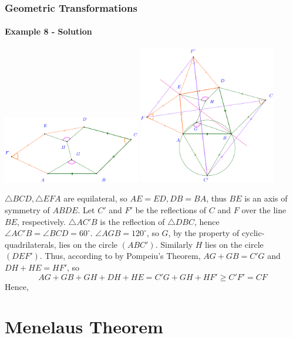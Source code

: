 \documentclass[8pt,xcolor=table,dvipsnames]{beamer}
\newcommand{\dg}{^\circ}
\begin{document}
\begin{frame}[t]
    \frametitle{Geometric Transformations}
    \framesubtitle{Example 8 - Solution}
    \begin{center}
        \begin{overprint}
            \centering\includegraphics[width=6cm]{./svg/pdf/imo-1995-5-1.pdf}
            \centering\includegraphics[width=6cm]{./svg/pdf/imo-1995-5-2.pdf}
        \end{overprint}
    \end{center}
    \begin{overprint}
        $\triangle BCD, \triangle EFA$ are equilateral, so $AE=ED, DB=BA$, thus $BE$ is an axis of symmetry of $ABDE.$
        Let $C'$ and $F'$ be the reflections of $C$ and $F$ over the line $BE$, respectively.
        $\triangle AC'B$ is the reflection of $\triangle DBC$, hence $\angle AC'B = \angle BCD = 60\dg.$
        $\angle AGB = 120\dg$, so $G$, by the property of cyclic-quadrilaterals, lies on the circle $(ABC').$
        Similarly $H$ lies on the circle $(DEF').$
        Thus, according to by Pompeiu's Theorem, $AG+GB=C'G$ and $DH+HE=HF'$, so
        \[ AG + GB + GH + DH + HE = C'G + GH + HF' \ge C'F'= CF \]
        Hence, 
    \end{overprint}
\end{frame}

\section{Menelaus Theorem}
\end{document}
